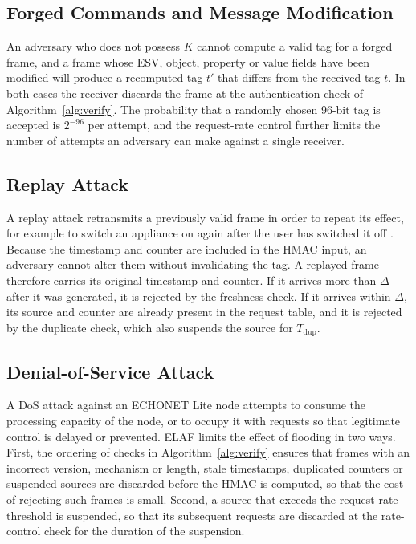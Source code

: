 \subsection{Forged Commands and Message Modification}

An adversary who does not possess $K$ cannot compute a valid tag for a forged frame, and a frame whose ESV, object, property or value fields have been modified will produce a recomputed tag $t'$ that differs from the received tag $t$. In both cases the receiver discards the frame at the authentication check of Algorithm~\ref{alg:verify}. The probability that a randomly chosen 96-bit tag is accepted is $2^{-96}$ per attempt, and the request-rate control further limits the number of attempts an adversary can make against a single receiver.

\subsection{Replay Attack}

A replay attack retransmits a previously valid frame in order to repeat its effect, for example to switch an appliance on again after the user has switched it off \citep{heartfieldTaxonomyCyberphysicalThreats2018}. Because the timestamp and counter are included in the HMAC input, an adversary cannot alter them without invalidating the tag. A replayed frame therefore carries its original timestamp and counter. If it arrives more than $\Delta$ after it was generated, it is rejected by the freshness check. If it arrives within $\Delta$, its source and counter are already present in the request table, and it is rejected by the duplicate check, which also suspends the source for $T_{\mathrm{dup}}$.

\subsection{Denial-of-Service Attack}

A DoS attack against an ECHONET Lite node attempts to consume the processing capacity of the node, or to occupy it with requests so that legitimate control is delayed or prevented. ELAF limits the effect of flooding in two ways. First, the ordering of checks in Algorithm~\ref{alg:verify} ensures that frames with an incorrect version, mechanism or length, stale timestamps, duplicated counters or suspended sources are discarded before the HMAC is computed, so that the cost of rejecting such frames is small. Second, a source that exceeds the request-rate threshold is suspended, so that its subsequent requests are discarded at the rate-control check for the duration of the suspension.

